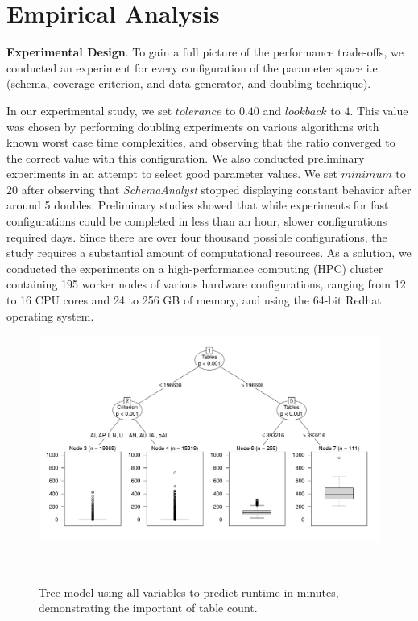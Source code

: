 


\section{Empirical Analysis}

\textbf{Experimental Design}. To gain a full picture of the performance trade-offs, we conducted an experiment for every configuration
of the parameter space i.e. (schema, coverage criterion, and data generator, and doubling technique). 

In our experimental study, we set $\mathit{tolerance}$ to $0.40$ and $\mathit{lookback}$ to $4$. This value was chosen
by performing doubling experiments on various algorithms with known worst case time complexities, and observing that the
ratio converged to the correct value with this configuration.  We also conducted preliminary experiments in an attempt
to select good parameter values. We set $\mathit{minimum}$ to $20$ after observing that \textit{SchemaAnalyst} stopped
displaying constant behavior after around 5 doubles.  Preliminary studies showed that while experiments for fast
configurations could be completed in less than an hour, slower configurations required days.  Since there are over four
thousand possible configurations, the study requires a substantial amount of computational resources.  As a solution, we
conducted the experiments on a high-performance computing (HPC) cluster containing 195 worker nodes of various hardware
configurations, ranging from 12 to 16 CPU cores and 24 to 256 GB of memory, and using the 64-bit Redhat operating
system.

\begin{figure}[t]
\centering
  \centering
  \includegraphics[width=1.025\linewidth]{diagrams/AllTree.pdf}
  \vspace*{-.25in}
  \caption{Tree model using all variables to predict runtime in minutes, demonstrating the important of table count.
  \vspace{-.30in}}~\label{fig:atree}
\end{figure}
